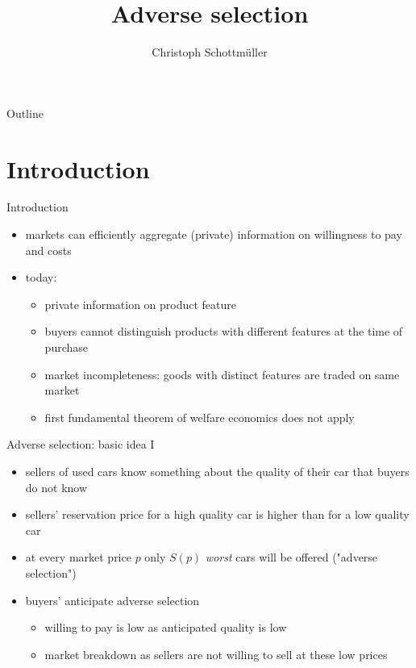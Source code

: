 \documentclass[bigger]{beamer}
\author{Christoph Schottmüller}
\date{}
\title{Adverse selection}
\begin{document}
\maketitle
\begin{frame}{Outline}
\tableofcontents
\end{frame}



\section{Introduction}
\label{sec:org18d3d17}
\begin{frame}[label={sec:orge1d6970}]{Introduction}
\begin{itemize}
\item markets can efficiently aggregate (private) information on willingness to pay and costs
\item today:
\begin{itemize}
\item private information on product feature
\item buyers cannot distinguish products with different features at the time of purchase
\item market incompleteness: goods with distinct features are traded on same market
\item first fundamental theorem of welfare economics does not apply
\end{itemize}
\end{itemize}
\end{frame}
\begin{frame}[label={sec:org17736a7}]{Adverse selection: basic idea I}
\begin{itemize}
\item sellers of used cars know something about the quality of their car that buyers do not know
\item sellers' reservation price for a high quality car is higher than for a low quality car
\item at every market price \(p\) only \(S(p)\) \emph{worst} cars will be offered ("adverse selection")
\item buyers' anticipate adverse selection
\begin{itemize}
\item willing to pay is low as anticipated quality is low
\item market breakdown as sellers are not willing to sell at these low prices
\end{itemize}
\end{itemize}
\end{frame}
\end{document}
